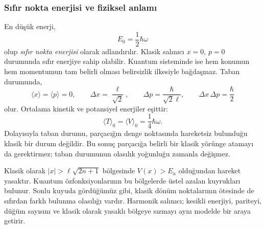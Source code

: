 \documentclass[00_kitap.tex]{subfiles}
\begin{document}
\subsubsection{Sıfır nokta enerjisi ve fiziksel anlamı}

En düşük enerji,
\begin{equation}
 E_0=\frac12\hbar\omega
\end{equation}
olup \emph{sıfır nokta enerjisi} olarak adlandırılır. Klasik
salınıcı $x=0$, $p=0$ durumunda sıfır enerjiye sahip olabilir.
Kuantum sisteminde ise hem konumun hem momentumun tam belirli
olması belirsizlik ilkesiyle bağdaşmaz. Taban durumunda,
\begin{equation}
 \langle x\rangle=\langle p\rangle=0,\qquad
 \Delta x=\frac{\ell}{\sqrt{2}},\qquad
 \Delta p=\frac{\hbar}{\sqrt{2}\ell},\qquad
 \Delta x\,\Delta p=\frac{\hbar}{2}
\end{equation}
olur. Ortalama kinetik ve potansiyel enerjiler eşittir:
\begin{equation}
 \langle T\rangle_0=\langle V\rangle_0=\frac14\hbar\omega.
\end{equation}
Dolayısıyla taban durumu, parçacığın denge noktasında hareketsiz
bulunduğu klasik bir durum değildir. Bu sonuç parçacığa belirli bir
klasik yörünge atamayı da gerektirmez; taban durumunun olasılık
yoğunluğu zamanla değişmez.

Klasik olarak $|x|>\ell\sqrt{2n+1}$ bölgesinde $V(x)>E_n$ olduğundan
hareket yasaktır. Kuantum özfonksiyonlarının bu bölgelerde üstel
azalan kuyrukları bulunur. Sonlu kuyuda gördüğümüz gibi, klasik
dönüm noktalarının ötesinde de sıfırdan farklı bulunma olasılığı
vardır. Harmonik salınıcı; kesikli enerjiyi, pariteyi, düğüm sayısını
ve klasik olarak yasaklı bölgeye sızmayı aynı modelde bir araya getirir.

\BolumKaynakcaBitir
\end{document}
